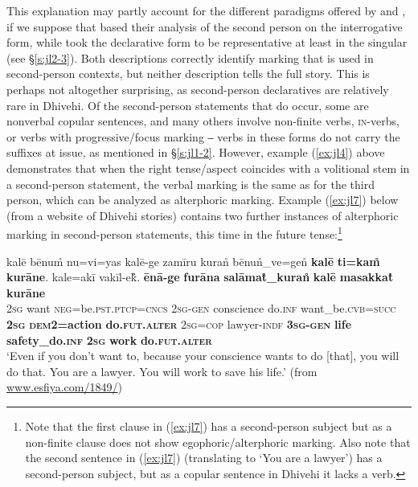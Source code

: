 \documentclass[output=paper]{langsci/langscibook}
\begin{document}
This explanation may partly account for the different paradigms offered by \cite{CainGair2000} and \cite{Fritz2002}, if we suppose that  \citeauthor{CainGair2000} based their analysis of the second person on the interrogative form, while \citeauthor{Fritz2002} took the declarative form to be representative at least in the singular (see §\ref{s:jl2-3}). Both descriptions correctly identify marking that is used in second-person contexts, but neither description tells the full story. This is perhaps not altogether surprising, as second-person declaratives are relatively rare in Dhivehi. Of the second-person statements that do occur, some are nonverbal copular sentences, and many others involve non-finite verbs, \textsc{in}-verbs, or verbs with progressive/focus marking ‒ verbs in these forms do not carry the suffixes at issue, as mentioned in §\ref{s:jl1-2}. However, example (\ref{ex:jl4}) above demonstrates that when the right tense/aspect coincides with a volitional stem in a second-person statement, the verbal marking is the same as for the third person, which can be analyzed as alterphoric marking. Example (\ref{ex:jl7}) below (from a website of Dhivehi stories) contains two further instances of alterphoric marking in second-person statements, this time in the future tense:\footnote{Note that the first clause in (\ref{ex:jl7}) has a second-person subject but as a non-finite clause does not show egophoric/alterphoric marking. Also note that the second sentence in (\ref{ex:jl7}) (translating to ‘You are a lawyer’) has a second-person subject, but as a copular sentence in Dhivehi it lacks a verb.}
   
\begin{exe}
	\ex 	\label{ex:jl7}
	\gll kalē bēnum̊ nu=vi=yas kalē-ge zamīru kuran̊ bēnun̊\_ve=gen̊ \textbf{kalē} \textbf{ti=kam̊} \textbf{kurāne}. kale=akī vakīl-ek̊̊. \textbf{ēnā-ge} \textbf{furāna} \textbf{salāmat̊\_kuran̊} \textbf{kalē} \textbf{masakkat̊} \textbf{kurāne}\\
	2\textsc{sg} want \textsc{neg}=be.\textsc{pst}.\textsc{ptcp}=\textsc{cncs} 2\textsc{sg}-\textsc{gen} conscience do.\textsc{inf} want\_be.\textsc{cvb}=\textsc{succ} \textbf{2\textsc{sg}} \textbf{\textsc{dem}2=action} \textbf{do.\textsc{fut}.\textsc{alter}} 2\textsc{sg}=\textsc{cop} lawyer-\textsc{indf} \textbf{3\textsc{sg}-\textsc{gen}} \textbf{life} \textbf{safety\_do.\textsc{inf}} \textbf{2\textsc{sg}} \textbf{work} \textbf{do.\textsc{fut}.\textsc{alter}}\\
	\trans ‘Even if you don’t want to, because your conscience wants to do [that], you will do that. You are a lawyer. You will work to save his life.’ (from \url{www.esfiya.com/1849/})
\end{exe}
 
\end{document}
